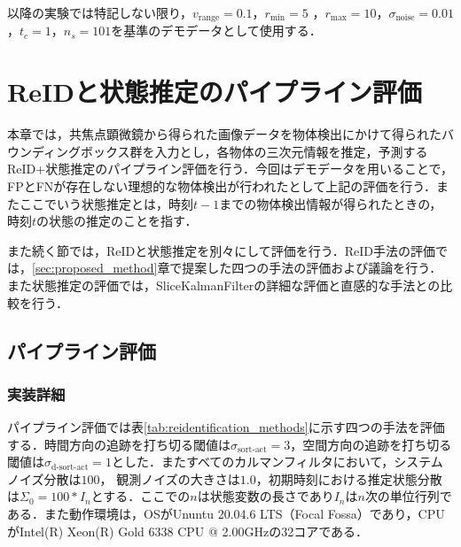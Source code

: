 以降の実験では特記しない限り，$v_{\text{range}} = 0.1$，$r_{\text{min}} = 5$ ，$r_{\text{max}} = 10$，$\sigma_{\text{noise}} = 0.01$，$t_c = 1$，$n_s = 101$を基準のデモデータとして使用する．

\section{ReIDと状態推定のパイプライン評価}
\label{sec:pipeline}

    本章では，共焦点顕微鏡から得られた画像データを物体検出にかけて得られたバウンディングボックス群を入力とし，各物体の三次元情報を推定，予測するReID+状態推定のパイプライン評価を行う．今回はデモデータを用いることで，FPとFNが存在しない理想的な物体検出が行われたとして上記の評価を行う．またここでいう状態推定とは，時刻$t-1$までの物体検出情報が得られたときの，時刻$t$の状態の推定のことを指す．

    また続く節では，ReIDと状態推定を別々にして評価を行う．ReID手法の評価では，\ref{sec:proposed_method}章で提案した四つの手法の評価および議論を行う．また状態推定の評価では，SliceKalmanFilterの詳細な評価と直感的な手法との比較を行う．

    \subsection{パイプライン評価}
    \label{subsec:pipeline_evaluation}

    \subsubsection{実装詳細}
    パイプライン評価では表\ref{tab:reidentification_methods}に示す四つの手法を評価する．時間方向の追跡を打ち切る閾値は$\sigma_{\text{sort-act}} = 3$，空間方向の追跡を打ち切る閾値は$\sigma_{\text{d-sort-act}} = 1$とした．またすべてのカルマンフィルタにおいて，システムノイズ分散は$100$，
    観測ノイズの大きさは$1.0$，初期時刻における推定状態分散は$\Sigma_0 = 100 * I_n$とする．ここでの$n$は状態変数の長さであり$I_n$は$n$次の単位行列である．また動作環境は，OSがUnuntu 20.04.6 LTS（Focal Fossa）であり，CPUがIntel(R) Xeon(R) Gold 6338 CPU @ 2.00GHzの32コアである．

